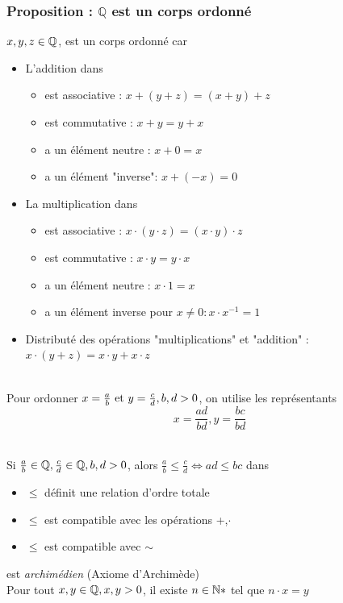 \documentclass[12pt,a4paper]{article}
\begin{document}
\subsubsection{Proposition : $\mathbb{Q}$ est un corps ordonné}
$x,y,z \in \mathbb{Q}$, \Q est un corps ordonné car
{\setlength{\baselineskip}{5pt}
\begin{itemize}
	\item L'addition dans \Q 
		\begin{itemize}
			\item est associative :  $x+(y+z)=(x+y)+z$
			\item est commutative : $x+y = y+x$
			\item a un élément neutre : $x + 0 = x$
			\item a un élément "inverse": $x+ (-x) = 0$
		\end{itemize}
	\item La multiplication dans \Q
		\begin{itemize}
			\item est associative :  $x\cdot(y\cdot z)=(x\cdot y)\cdot z$
			\item est commutative : $x\cdot y = y\cdot x$
			\item a un élément neutre : $x \cdot 1 = x$
			\item a un élément  inverse pour $x \neq 0: x\cdot x^{-1} = 1$
		\end{itemize}
	\item Distributé des opérations "multiplications" et "addition" : \\
			$x\cdot (y+z) = x \cdot y + x \cdot z$
\end{itemize}}
\\
Pour ordonner $x = \frac{a}{b} \mbox{ et } y = \frac{c}{d}, b,d > 0$, on utilise les représentants 
\begin{equation}
	x = \frac{ad}{bd}, y = \frac{bc}{bd}
\end{equation}
\begin{boite}[0.8]
	\Definition\\
	Si $\frac{a}{b} \in \mathbb{Q}, \frac{c}{d}\in \mathbb{Q}, b,d > 0$, alors $\frac{a}{b} \leq \frac{c}{d} \iff ad \leq bc$ dans \Z
\end{boite}
\begin{itemize}
	\item $\leq$ définit une relation d'ordre totale
	\item $\leq$ est compatible avec les opérations +,$\cdot$
	\item $\leq$ est compatible avec $\sim$
\end{itemize}
 \Q est \textit{archimédien} (Axiome d'Archimède)\\
Pour tout $x,y \in \mathbb{Q}, x,y > 0$, il existe $n \in \mathbb{N}*$ tel que $n\cdot x = y$
\end{document}
